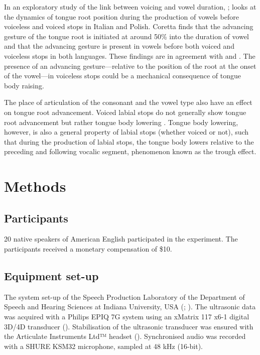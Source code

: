 \documentclass[preprint]{JASAnew}
\begin{document}
In an exploratory study of the link between voicing and vowel duration,
\citet{coretta2018f}; \citet{coretta2018d} looks at the dynamics of
tongue root position during the production of vowels before voiceless
and voiced stops in Italian and Polish. Coretta finds that the advancing
gesture of the tongue root is initiated at around 50\% into the duration
of vowel and that the advancing gesture is present in vowels before both
voiced and voiceless stops in both languages. These findings are in
agreement with \citet{rothenberg1967} and \citet{westbury1983}. The
presence of an advancing gesture---relative to the position of the root
at the onset of the vowel---in voiceless stops could be a mechanical
consequence of tongue body raising.

The place of articulation of the consonant and the vowel type also have
an effect on tongue root advancement. Voiced labial stops do not
generally show tongue root advancement but rather tongue body lowering
\citep{svirsky1997, vazquez-alvarez2007}. Tongue body lowering, however,
is also a general property of labial stops (whether voiced or not), such
that during the production of labial stops, the tongue body lowers
relative to the preceding and following vocalic segment, phenomenon
known as the trough effect.

\section{Methods}\label{methods}

\subsection{Participants}\label{participants}

20 native speakers of American English participated in the experiment.
The participants received a monetary compensation of \$10.

\subsection{Equipment set-up}\label{equipment-set-up}

The system set-up of the Speech Production Laboratory of the Department
of Speech and Hearing Sciences at Indiana University, USA
(\citet{lulich2017}; \citet{charles2018}). The ultrasonic data was
acquired with a Philips EPIQ 7G system using an xMatrix 117 x6-1 digital
3D/4D transducer (). Stabilisation of the ultrasonic transducer was
ensured with the Articulate Instruments Ltd™ headset
(\citeyear{articulate2008}). Synchronised audio was recorded with a
SHURE KSM32 microphone, sampled at 48 kHz (16-bit).
\end{document}
